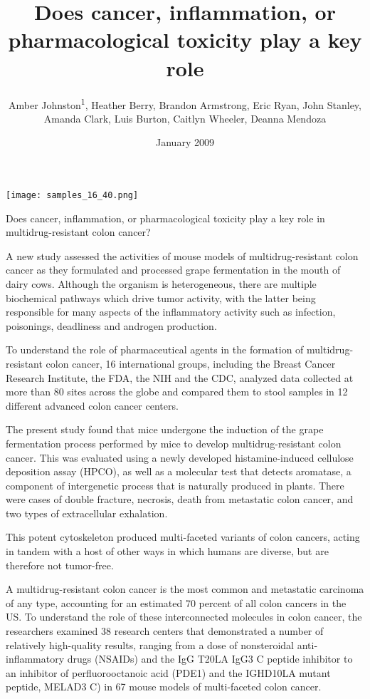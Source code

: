 \documentclass{article}
\title{Does cancer, inflammation, or pharmacological toxicity play a key role}
\author{Amber Johnston\textsuperscript{1},  Heather Berry,  Brandon Armstrong,  Eric Ryan,  John Stanley,  Amanda Clark,  Luis Burton,  Caitlyn Wheeler,  Deanna Mendoza}
\affil{\textsuperscript{1}Interamerican Open University}
\date{January 2009}
\begin{document}
\maketitle

\begin{center}
\begin{minipage}{0.75\linewidth}
\texttt{[image: samples\_16\_40.png]}
\end{minipage}
\end{center}

Does cancer, inflammation, or pharmacological toxicity play a key role in multidrug-resistant colon cancer?

A new study assessed the activities of mouse models of multidrug-resistant colon cancer as they formulated and processed grape fermentation in the mouth of dairy cows. Although the organism is heterogeneous, there are multiple biochemical pathways which drive tumor activity, with the latter being responsible for many aspects of the inflammatory activity such as infection, poisonings, deadliness and androgen production.

To understand the role of pharmaceutical agents in the formation of multidrug-resistant colon cancer, 16 international groups, including the Breast Cancer Research Institute, the FDA, the NIH and the CDC, analyzed data collected at more than 80 sites across the globe and compared them to stool samples in 12 different advanced colon cancer centers.

The present study found that mice undergone the induction of the grape fermentation process performed by mice to develop multidrug-resistant colon cancer. This was evaluated using a newly developed histamine-induced cellulose deposition assay (HPCO), as well as a molecular test that detects aromatase, a component of intergenetic process that is naturally produced in plants. There were cases of double fracture, necrosis, death from metastatic colon cancer, and two types of extracellular exhalation.

This potent cytoskeleton produced multi-faceted variants of colon cancers, acting in tandem with a host of other ways in which humans are diverse, but are therefore not tumor-free.

A multidrug-resistant colon cancer is the most common and metastatic carcinoma of any type, accounting for an estimated 70 percent of all colon cancers in the US. To understand the role of these interconnected molecules in colon cancer, the researchers examined 38 research centers that demonstrated a number of relatively high-quality results, ranging from a dose of nonsteroidal anti-inflammatory drugs (NSAIDs) and the IgG T20LA IgG3 C peptide inhibitor to an inhibitor of perfluorooctanoic acid (PDE1) and the IGHD10LA mutant peptide, MELAD3 C) in 67 mouse models of multi-faceted colon cancer.
\end{document}
